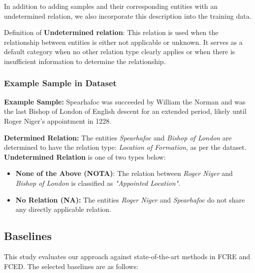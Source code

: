 In addition to adding samples and their corresponding entities with an undetermined relation, we also incorporate this description into the training data.

Definition of \textbf{Undetermined relation}: This relation is used when the relationship between entities is either not applicable or unknown. It serves as a default category when no other relation type clearly applies or when there is insufficient information to determine the relationship.


\subsubsection{Example Sample in Dataset}
\label{app:example}
\textbf{Example Sample:}  
Spearhafoc was succeeded by William the Norman and was the last Bishop of London of English descent for an extended period, likely until Roger Niger's appointment in 1228.

\textbf{Determined Relation:}  
The entities \textit{Spearhafoc} and \textit{Bishop of London} are determined to have the relation type: \textit{Location of Formation}, as per the dataset. \\
\textbf{Undetermined Relation} is one of two types below:
\begin{itemize}
\item \textbf{None of the Above (NOTA)}: The relation between \textit{Roger Niger} and \textit{Bishop of London} is classified as \textit{"Appointed Location"}.

\item \textbf{No Relation (NA):}  
The entities \textit{Roger Niger} and \textit{Spearhafoc} do not share any directly applicable relation.
\end{itemize}
\subsection{Baselines}
\label{sec:appendix_baseline1}

This study evaluates our approach against state-of-the-art methods in FCRE and FCED. The selected baselines are as follows:

